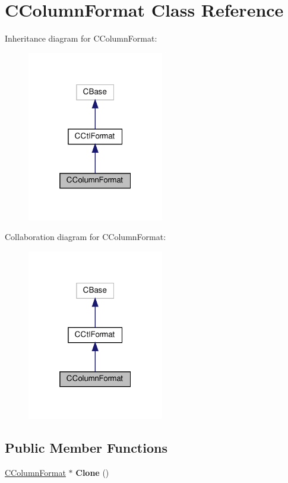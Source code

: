 \hypertarget{classCColumnFormat}{}\section{C\+Column\+Format Class Reference}
\label{classCColumnFormat}


Inheritance diagram for C\+Column\+Format\+:
\nopagebreak
\begin{figure}[H]
\begin{center}
\leavevmode
\includegraphics[width=169pt]{classCColumnFormat__inherit__graph}
\end{center}
\end{figure}


Collaboration diagram for C\+Column\+Format\+:
\nopagebreak
\begin{figure}[H]
\begin{center}
\leavevmode
\includegraphics[width=169pt]{classCColumnFormat__coll__graph}
\end{center}
\end{figure}
\subsection*{Public Member Functions}
\begin{DoxyCompactItemize}
\item 
\mbox{\label{classCColumnFormat_aae9c5f8938e58fbe682af6ab580b8810}} 
\hyperlink{classCColumnFormat}{C\+Column\+Format} $\ast$ {\bfseries Clone} ()
\end{DoxyCompactItemize}
